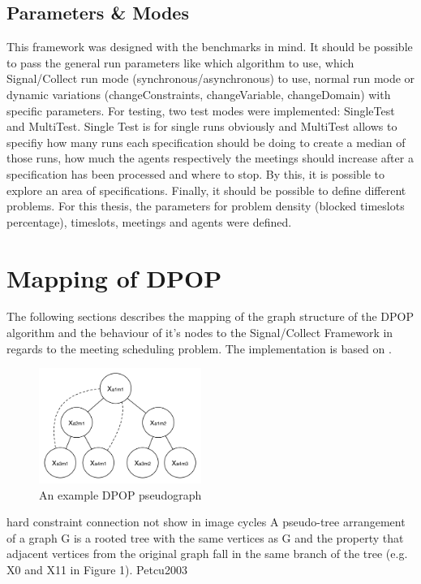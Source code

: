 \subsection{Parameters \& Modes}
This framework was designed with the benchmarks in mind.  It should be possible to pass the general run parameters like which algorithm to use, which Signal/Collect run mode (synchronous/asynchronous) to use, normal run mode or dynamic variations (changeConstraints, changeVariable, changeDomain) with specific parameters. For testing, two test modes were implemented: SingleTest and MultiTest. Single Test is for single runs obviously and MultiTest allows to specifiy how many runs each specification should be doing to create a median of those runs, how much the agents respectively the meetings should increase after a specification has been processed and where to stop. By this, it is possible to explore an area of specifications. Finally, it should be possible to define different problems. For this thesis, the parameters for problem density (blocked timeslots percentage), timeslots, meetings and agents were defined.

\section{Mapping of DPOP}

The following sections describes the mapping of the graph structure of the DPOP algorithm and the behaviour of it's nodes to the Signal/Collect Framework  in regards to the meeting scheduling problem. The implementation is based on \cite{Petcu2003}.

\begin{figure}[h]
\includegraphics[width=200px]{graphics/dpop_graph}
\centering
\caption{An example DPOP pseudograph}
\label{fig:dpop_graph}
\end{figure}

hard constraint connection not show in image
cycles
A pseudo-tree arrangement of a graph G is a rooted tree with the same vertices as G and the property that adjacent vertices from the original graph fall in the same branch of the tree (e.g. X0 and X11 in Figure 1). Petcu2003


